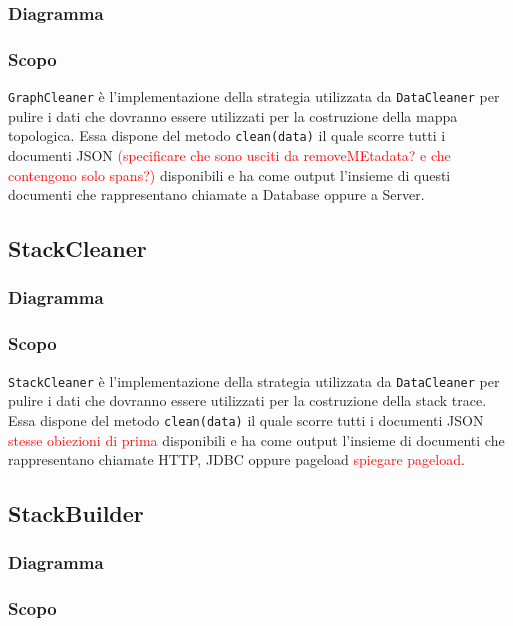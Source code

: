 	\subsubsection{Diagramma}

	\subsubsection{Scopo}
	\texttt{GraphCleaner} è l'implementazione della strategia utilizzata da \texttt{DataCleaner} per pulire i dati che dovranno essere utilizzati per la costruzione della mappa topologica. Essa dispone del metodo \texttt{clean(data)} il quale scorre tutti i documenti JSON \textcolor{red}{(specificare che sono usciti da removeMEtadata? e che contengono solo spans?)} disponibili e ha come output l'insieme di questi documenti che rappresentano chiamate a Database oppure a Server.
	
\subsection{StackCleaner}
\label{sec:StackCleaner}
	\subsubsection{Diagramma}
	
	\subsubsection{Scopo}
	\texttt{StackCleaner} è l'implementazione della strategia utilizzata da \texttt{DataCleaner} per pulire i dati che dovranno essere utilizzati per la costruzione della stack trace. Essa dispone del metodo \texttt{clean(data)} il quale scorre tutti i documenti JSON \textcolor{red}{stesse obiezioni di prima} disponibili e ha come output l'insieme di documenti che rappresentano chiamate HTTP, JDBC oppure pageload \textcolor{red}{spiegare pageload}.
	

\subsection{StackBuilder}
\label{sec:StackBuilder}
	\subsubsection{Diagramma}

	\subsubsection{Scopo}
	
